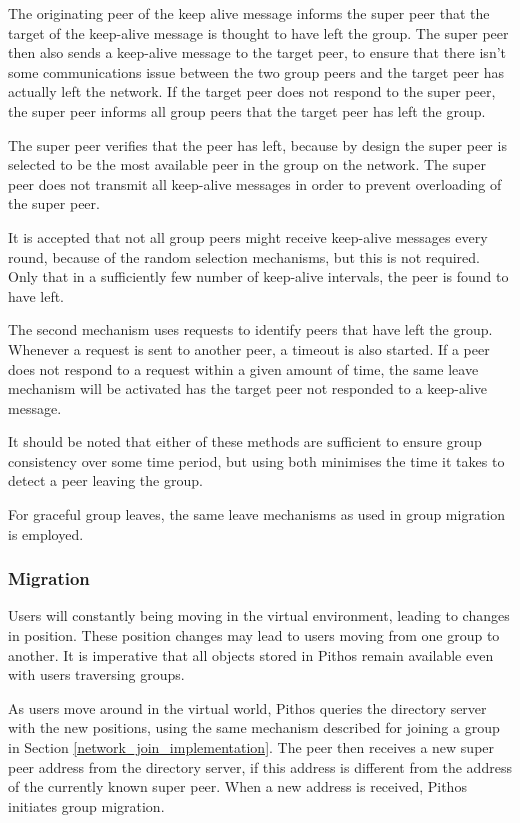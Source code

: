 The originating peer of the keep alive message informs the super peer that the target of the keep-alive message is thought to have left the group. The super peer then also sends a keep-alive message to the target peer, to ensure that there isn't some communications issue between the two group peers and the target peer has actually left the network. If the target peer does not respond to the super peer, the super peer informs all group peers that the target peer has left the group.

The super peer verifies that the peer has left, because by design the super peer is selected to be the most available peer in the group on the network. The super peer does not transmit all keep-alive messages in order to prevent overloading of the super peer.

It is accepted that not all group peers might receive keep-alive messages every round, because of the random selection mechanisms, but this is not required. Only that in a sufficiently few number of keep-alive intervals, the peer is found to have left.

The second mechanism uses requests to identify peers that have left the group. Whenever a request is sent to another peer, a timeout is also started. If a peer does not respond to a request within a given amount of time, the same leave mechanism will be activated has the target peer not responded to a keep-alive message.

It should be noted that either of these methods are sufficient to ensure group consistency over some time period, but using both minimises the time it takes to detect a peer leaving the group.

For graceful group leaves, the same leave mechanisms as used in group migration is employed.

\subsubsection{Migration}

Users will constantly being moving in the virtual environment, leading to changes in position. These position changes may lead to users moving from one group to another. It is imperative that all objects stored in Pithos remain available even with users traversing groups.

As users move around in the virtual world, Pithos queries the directory server with the new positions, using the same mechanism described for joining a group in Section \ref{network_join_implementation}. The peer then receives a new super peer address from the directory server, if this address is different from the address of the currently known super peer. When a new address is received, Pithos initiates group migration.

